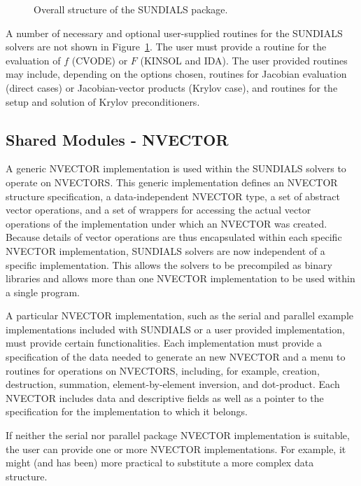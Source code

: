 \begin{figure}[tp]
\centerline{}
\caption{Overall structure of the SUNDIALS  package.}
\label{fig-sunorg}
\end{figure}

A number of necessary and optional user-supplied routines for the SUNDIALS
solvers are not shown in \mbox{Figure \ref{fig-sunorg}}. The user must
provide a routine for the evaluation of $f$ (CVODE) or $F$ (KINSOL and
IDA). The user provided routines may include, depending on the options
chosen, routines for Jacobian evaluation (direct cases) or Jacobian-vector
products (Krylov case), and routines for the setup and solution of Krylov
preconditioners.

\subsection{Shared Modules - NVECTOR}

A generic NVECTOR implementation is used within the SUNDIALS solvers to
operate on NVECTORS. This generic implementation defines an NVECTOR
structure specification, a data-independent NVECTOR type, a set of abstract
vector operations, and a set of wrappers for accessing the actual vector
operations of the implementation under which an NVECTOR was created. Because
details of vector operations are thus encapsulated within each specific
NVECTOR implementation, SUNDIALS solvers are now independent of a specific
implementation. This allows the solvers to be precompiled as binary
libraries and allows more than one NVECTOR implementation to be used within
a single program.

A particular NVECTOR implementation, such as the serial and parallel example
implementations included with SUNDIALS or a user provided implementation,
must provide certain functionalities. Each implementation must provide a
specification of the data needed to generate an new NVECTOR and a menu to
routines for operations on NVECTORS, including, for example, creation,
destruction, summation, element-by-element inversion, and dot-product. Each
NVECTOR includes data and descriptive fields as well as a pointer to the
specification for the implementation to which it belongs.

If neither the serial nor parallel package NVECTOR implementation is
suitable, the user can provide one or more NVECTOR implementations.  For
example, it might (and has been) more practical to substitute a more complex
data structure.


